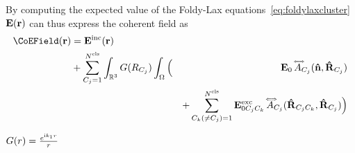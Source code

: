 By computing the expected value of the Foldy-Lax equations~\eqref{eq:foldylaxcluster} $\mathbf{E}(\mathbf{r})$ can thus express the coherent field as 
\begin{align}
\CoEField(\px) & = \IncEField(\px) & \\ 
& +  \sum_{{\Cls_j}=1}^\Ncls \int_{\Real^3} G(\tPx_{\Cls_j}) \int_\Omega \Big( & \EField_0 \,  \ScaDyad_{\Cls_j}(\dw,\dPx_{\Cls_j}) \\ & & + \sum_{{\Cls_k}(\neq{\Cls_j})=1}^\Ncls \ExcEField_{0{\Cls_j} {\Cls_k}} \, \ScaDyad_{\Cls_j}(\dPx_{{\Cls_j}{\Cls_k}},\dPx_{\Cls_j}) \Big)
\end{align}

$G(r) = \frac{e^{\text{i} k_1 r}}{r}$

